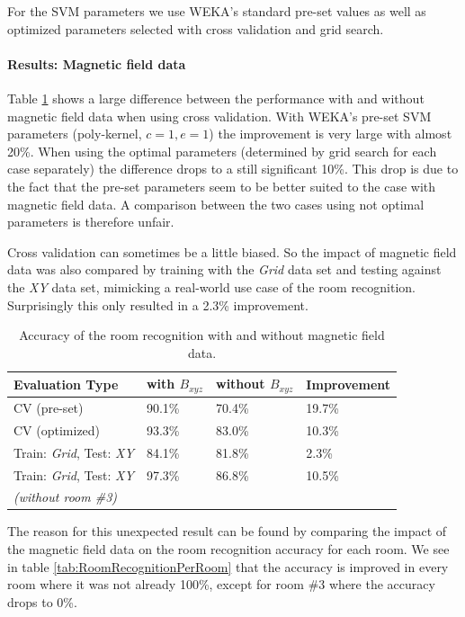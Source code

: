 For the SVM parameters we use WEKA's standard pre-set values as well as optimized parameters selected with cross validation and grid search.

\paragraph{Results: Magnetic field data}

Table \ref{tab:RoomRecognitionMagneticField} shows a large difference between the performance with and without magnetic field data when using cross validation. With WEKA's pre-set SVM parameters (poly-kernel, $c=1,e=1$) the improvement is very large with almost 20\%. When using the optimal parameters (determined by grid search for each case separately) the difference drops to a still significant 10\%. This drop is due to the fact that the pre-set parameters seem to be better suited to the case with magnetic field data. A comparison between the two cases using not optimal parameters is therefore unfair.

Cross validation can sometimes be a little biased. So the impact of magnetic field data was also compared by training with the \emph{Grid} data set and testing against the \emph{XY} data set, mimicking a real-world use case of the room recognition. Surprisingly this only resulted in a 2.3\% improvement.



\begin{table}
\centering
\begin{tabular}{l l l l}
\toprule
\textbf{Evaluation Type}&\textbf{with }\boldmath$B_{xyz}$&\textbf{without }\boldmath$B_{xyz}$&\textbf{Improvement} \\
\midrule
CV (pre-set)&90.1\%&70.4\%&19.7\%\\
CV (optimized)&93.3\%&83.0\%&10.3\%\\
Train: \emph{Grid}, Test: \emph{XY}&84.1\%&81.8\%&2.3\%\\
Train: \emph{Grid}, Test: \emph{XY}&97.3\%&86.8\%&10.5\%\\
\textit{(without room \#3)}&&\\
\bottomrule
\end{tabular}
\caption[Room Recognition - Magnetic Field improvements]{Accuracy of the room recognition with and without magnetic field data.}
\label{tab:RoomRecognitionMagneticField}
\end{table}

The reason for this unexpected result can be found by comparing the impact of the magnetic field data on the  room recognition accuracy for each room. We see in table \ref{tab:RoomRecognitionPerRoom} that the accuracy is improved in every room where it was not already 100\%, except for room \#3 where the accuracy drops to 0\%.

